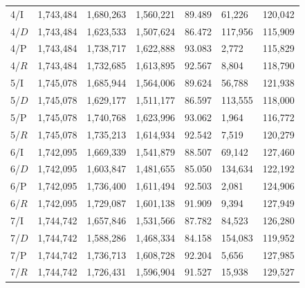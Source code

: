 \documentclass[12pt,a4paper]{article}
\begin{document}
\begin{xltabular}{\textwidth}{@{}YYYYYYY@{}}
4/I & 1,743,484 & 1,680,263 & 1,560,221 & 89.489 & 61,226 & 120,042 \\
4/$D$ & 1,743,484 & 1,623,533 & 1,507,624 & 86.472 & 117,956 & 115,909 \\
4/P & 1,743,484 & 1,738,717 & 1,622,888 & 93.083 & 2,772 & 115,829 \\
4/$R$ & 1,743,484 & 1,732,685 & 1,613,895 & 92.567 & 8,804 & 118,790 \\
5/I & 1,745,078 & 1,685,944 & 1,564,006 & 89.624 & 56,788 & 121,938 \\
5/$D$ & 1,745,078 & 1,629,177 & 1,511,177 & 86.597 & 113,555 & 118,000 \\
5/P & 1,745,078 & 1,740,768 & 1,623,996 & 93.062 & 1,964 & 116,772 \\
5/$R$ & 1,745,078 & 1,735,213 & 1,614,934 & 92.542 & 7,519 & 120,279 \\
6/I & 1,742,095 & 1,669,339 & 1,541,879 & 88.507 & 69,142 & 127,460 \\
6/$D$ & 1,742,095 & 1,603,847 & 1,481,655 & 85.050 & 134,634 & 122,192 \\
6/P & 1,742,095 & 1,736,400 & 1,611,494 & 92.503 & 2,081 & 124,906 \\
6/$R$ & 1,742,095 & 1,729,087 & 1,601,138 & 91.909 & 9,394 & 127,949 \\
7/I & 1,744,742 & 1,657,846 & 1,531,566 & 87.782 & 84,523 & 126,280 \\
7/$D$ & 1,744,742 & 1,588,286 & 1,468,334 & 84.158 & 154,083 & 119,952 \\
7/P & 1,744,742 & 1,736,713 & 1,608,728 & 92.204 & 5,656 & 127,985 \\
7/$R$ & 1,744,742 & 1,726,431 & 1,596,904 & 91.527 & 15,938 & 129,527 \\
\end{xltabular}
\endgroup
\end{document}

